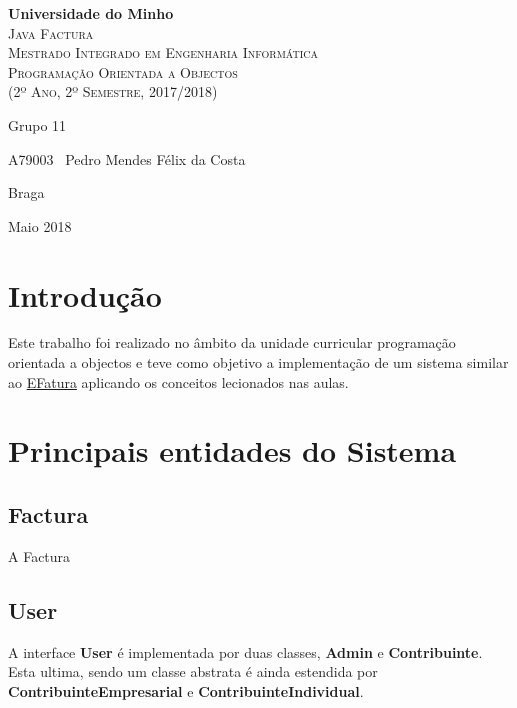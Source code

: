 \documentclass[10pt,a4paper]{article}
\begin{document}
\begin{titlepage}
    \center
    {\huge {\bf Universidade do Minho}}\\[0.4cm]
    \vspace{3.0cm}
    \textsc{\huge{Java Factura}}\\[0.5cm]
    \vspace{3.0cm}
    \textsc{\huge{Mestrado Integrado em Engenharia Informática}}\\[0.5cm]
    \vspace{2.0cm}
    \textsc{Programação Orientada a Objectos}\\[0.5cm]
    \textsc{(2º Ano, 2º Semestre, 2017/2018)}\\[0.5cm]
    \vspace{1.5cm}
    \begin{flushleft}
        Grupo 11
        \vspace{1cm}

        A79003 \,\,\,Pedro Mendes Félix da Costa
    \end{flushleft}
        \vspace{1cm}
    \begin{flushright}
        Braga

        Maio 2018
    \end{flushright}

\end{titlepage}

\tableofcontents
\clearpage

\section{Introdução}
    Este trabalho foi realizado no âmbito da unidade curricular programação
    orientada a objectos e teve como objetivo a implementação de um sistema
    similar ao \href{www.efactura.pt}{EFatura} aplicando os conceitos
    lecionados nas aulas.

\section{Principais entidades do Sistema}
    \subsection{Factura}
    A Factura 
    \subsection{User}
    A interface \textbf{User} é implementada por duas classes, \textbf{Admin} e
    \textbf{Contribuinte}. Esta ultima, sendo um classe abstrata é ainda
    estendida por \textbf{ContribuinteEmpresarial} e
    \textbf{ContribuinteIndividual}.
\end{document}
